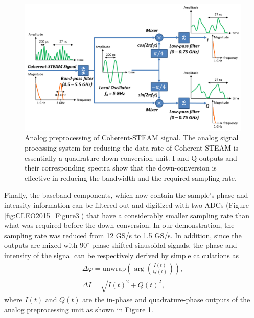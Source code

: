 \begin{figure}[htb!]
\centering
\includegraphics[scale=0.58]{CLEO2015/Figure2.png}
\caption{Analog preprocessing of Coherent-STEAM signal. The analog signal processing system for reducing the data rate of Coherent-STEAM is essentially a quadrature down-conversion unit. I and Q outputs and their corresponding spectra show that the down-conversion is effective in reducing the bandwidth and the required sampling rate.}
\label{fig:CLEO2015_Figure2}
\end{figure}

Finally, the baseband components, which now contain the sample's phase and intensity information can be filtered out and digitized with two ADCs (Figure \ref{fig:CLEO2015_Figure3}) that have a considerably smaller sampling rate than what was required before the down-conversion. In our demonstration, the sampling rate was reduced from 12 GS/s to 1.5 GS/s. In addition, since the outputs are mixed with $90^{\circ}$ phase-shifted sinusoidal signals, the phase and intensity of the signal can be respectively derived by simple calculations as
\begin{eqnarray}
\Delta\varphi = \textrm{unwrap}(\arg(\frac{I(t)}{Q(t)})), \\
\Delta I = \sqrt{I(t)^2 + Q(t)^2},
\end{eqnarray}
where $I(t)$ and $Q(t)$ are the in-phase and quadrature-phase outputs of the analog preprocessing unit as shown in Figure \ref{fig:CLEO2015_Figure2}. 

